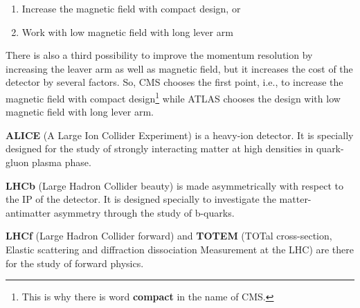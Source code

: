 \begin{enumerate}
	\item Increase the magnetic field with compact design, or
	\item Work with low magnetic field with long lever arm
\end{enumerate}

There is also a third possibility to improve the momentum resolution by increasing the leaver arm as well as magnetic field, but it increases the cost of the detector by several factors. So, CMS chooses the first point, i.e., to increase the magnetic field with compact design\footnote{This is why there is word {\bf compact} in the name of CMS.} while ATLAS chooses the design with low magnetic field with long lever arm.


{\bf ALICE} (A Large Ion Collider Experiment) is a heavy-ion detector. It is specially designed for the study of strongly interacting matter at high densities in quark-gluon plasma phase.

{\bf LHCb} (Large Hadron Collider beauty) is made asymmetrically with respect to the IP of the detector. It is designed specially to investigate the matter-antimatter asymmetry through the study of b-quarks.

{\bf LHCf} (Large Hadron Collider forward) and {\bf TOTEM} (TOTal cross-section, Elastic scattering and diffraction dissociation Measurement at the LHC) are there for the study of forward physics.

